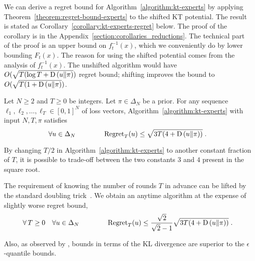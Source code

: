 We can derive a regret bound for Algorithm~\ref{algorithm:kt-experts} by
applying Theorem~\ref{theorem:regret-bound-experts} to the shifted KT potential.
The result is stated as Corollary~\ref{corollary:kt-experts-regret} below. The
proof of the corollary is in the Appendix~\ref{section:corollaries_reductions}.
The technical part of the proof is an upper bound on $f_t^{-1}(x)$, which we
conveniently do by lower bounding $F_t(x)$. The reason for using the shifted
potential comes from the analysis of $f_t^{-1}(x)$. The unshifted algorithm would
have $O(\sqrt{T (\log T + \operatorname*{D}\left({u}\middle\|{\pi}\right)})$ regret bound; shifting improves the
bound to $O(\sqrt{T (1 + \operatorname*{D}\left({u}\middle\|{\pi}\right)})$.

\begin{corollary}
\label{corollary:kt-experts-regret}
Let $N \ge 2$ and $T \ge 0$ be integers. Let $\pi \in \Delta_N$ be a prior.
For any sequence $\ell_1, \ell_2, \dots, \ell_T \in
[0,1]^N$ of loss vectors, Algorithm~\ref{algorithm:kt-experts}
with input $N,T,\pi$ satisfies
$$
\forall u \in \Delta_N \qquad \qquad \operatorname{Regret}_T(u) \le \sqrt{3T (4 + \operatorname*{D}\left({u}\middle\|{\pi}\right))} \; .
$$
\end{corollary}
By changing $T/2$ in Algorithm~\ref{algorithm:kt-experts} to another constant
fraction of $T$, it is possible to trade-off between the two constants $3$ and
$4$ present in the square root.

The requirement of knowing the number of rounds $T$ in advance can be lifted by
the standard doubling trick~\citep[Section 2.3.1]{Shalev-Shwartz12}. We obtain
an anytime algorithm at the expense of slightly worse regret bound,
$$
\forall \, T \ge 0 \quad \forall u \in \Delta_N \qquad \qquad
\operatorname{Regret}_T(u) \le \frac{\sqrt{2}}{\sqrt{2} - 1} \sqrt{3T (4 + \operatorname*{D}\left({u}\middle\|{\pi}\right))} \; .
$$

Also, as observed by \citet{ChernovV10}, bounds in terms of the KL
divergence are superior to the $\epsilon$-quantile bounds.
